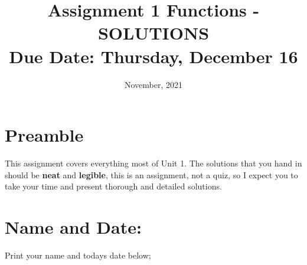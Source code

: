\documentclass[12pt]{article} %
\title{\textbf{Assignment 1 Functions - SOLUTIONS} \\ \textbf{Due Date: } Thursday, December 16}
\date{November, 2021}
\begin{document}
	\renewcommand*{\coursecode}{MATH 235} %
	\renewcommand*{\assgnnumber}{Assignment 1} %
	\renewcommand*{\submdate}{September 14, 2021} %
	\renewcommand*{\studentfname}{Abdullah} %
	\renewcommand*{\studentlname}{Zubair} %
    \renewcommand*{\proofname}{Proof:}

	\renewcommand\qedsymbol{$\blacksquare$}
	\setfigpath
	\fancyhfoffset[L,O]{0pt} %



\maketitle
	\section{Preamble}
  This assignment covers everything most of Unit 1. The solutions that you hand in should be \textbf{neat} and \textbf{legible},
  this is an assignment, not a quiz, so I expect you to take your time and present thorough and detailed solutions.
\section{Name and Date:}
	Print your name and todays date below;\\
\end{document}
